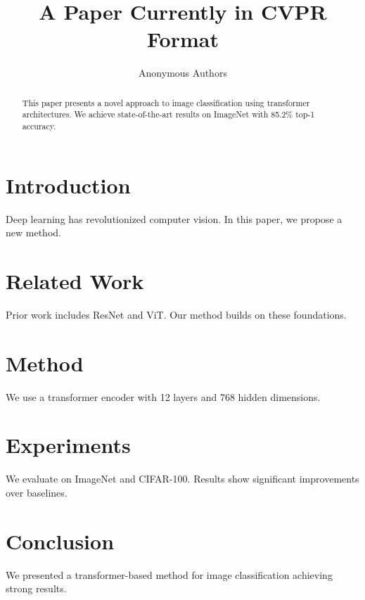 \documentclass{article}
\title{A Paper Currently in CVPR Format}
\author{Anonymous Authors}
\begin{document}
\maketitle

\begin{abstract}
This paper presents a novel approach to image classification using transformer architectures.
We achieve state-of-the-art results on ImageNet with 85.2\% top-1 accuracy.
\end{abstract}

\section{Introduction}
Deep learning has revolutionized computer vision. In this paper, we propose a new method.

\section{Related Work}
Prior work includes ResNet and ViT. Our method builds on these foundations.

\section{Method}
We use a transformer encoder with 12 layers and 768 hidden dimensions.

\section{Experiments}
We evaluate on ImageNet and CIFAR-100. Results show significant improvements over baselines.

\section{Conclusion}
We presented a transformer-based method for image classification achieving strong results.




\end{document}
